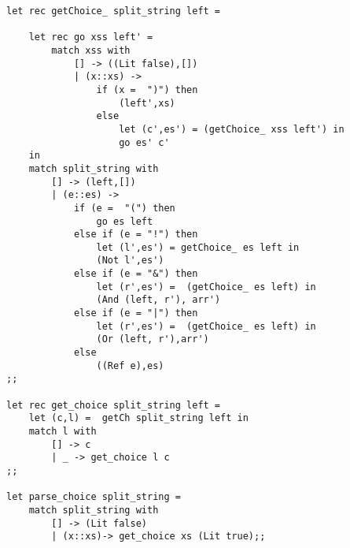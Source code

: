 \begin{lstlisting}
let rec getChoice_ split_string left = 
	
    let rec go xss left' = 
        match xss with 
            [] -> ((Lit false),[])
            | (x::xs) -> 
                if (x =  ")") then 
                    (left',xs)					
                else 
                    let (c',es') = (getChoice_ xss left') in 
                    go es' c'
    in 
    match split_string with 
        [] -> (left,[])
        | (e::es) -> 		
            if (e =  "(") then 
                go es left
            else if (e = "!") then 
                let (l',es') = getChoice_ es left in 
                (Not l',es')
            else if (e = "&") then 
                let (r',es') =  (getChoice_ es left) in 
                (And (left, r'), arr')
            else if (e = "|") then 
                let (r',es') =  (getChoice_ es left) in 
                (Or (left, r'),arr') 
            else 
                ((Ref e),es) 
;;

let rec get_choice split_string left = 
    let (c,l) =  getCh split_string left in
    match l with 
        [] -> c
        | _ -> get_choice l c
;;

let parse_choice split_string = 
    match split_string with 
        [] -> (Lit false)
        | (x::xs)-> get_choice xs (Lit true);; 
\end{lstlisting}